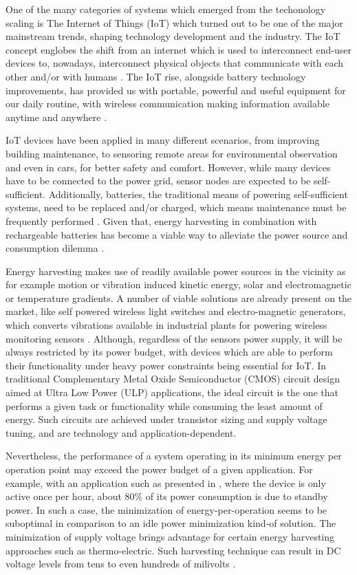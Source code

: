 \documentclass[pgmicro,diss,english]{iiufrgs}
\begin{document}
    One of the many categories of systems which emerged from the techonology scaling is The Internet of Things (IoT) which turned out to be one of the major mainstream trends, shaping technology development and the industry. The IoT concept englobes the shift from an internet which is used to interconnect end-user devices to, nowadays, interconnect physical objects that communicate with each other and/or with humans \cite{miorandi2012internet}. The IoT rise, alongside battery technology improvements, has provided us with portable, powerful and useful equipment for our daily routine, with wireless communication making information available anytime and anywhere \cite{manoli2010energy}.

    IoT devices have been applied in many different scenarios, from improving building maintenance, to sensoring remote areas for environmental observation and even in cars, for better safety and comfort. However, while many devices have to be connected to the power grid, sensor nodes are expected to be self-sufficient. Additionally, batteries, the traditional means of powering self-sufficient systems, need to be replaced and/or charged, which means maintenance must be frequently performed \cite{bleitner2018comparison}. Given that, energy harvesting in combination with rechargeable batteries has become a viable way to alleviate the power source and consumption dilemma \cite{manoli2010energy}.

    Energy harvesting makes use of readily available power sources in the vicinity as for example motion or vibration induced kinetic energy, solar and electromagnetic or temperature gradients. A number of viable solutions are already present on the market, like self powered wireless light switches and electro-magnetic generators, which converts vibrations available in industrial plants for powering wireless monitoring sensors \cite{manoli2010energy} \cite{bleitner2018comparison}. Although, regardless of the sensors power supply, it will be always restricted by its power budget, with devices which are able to perform their functionality under heavy power constraints being essential for IoT. In traditional Complementary Metal Oxide Semiconductor (CMOS) circuit design aimed at Ultra Low Power (ULP) applications, the ideal circuit is the one that performs a given task or functionality while consuming the least amount of energy. Such circuits are achieved under transistor sizing and supply voltage tuning, and are technology and application-dependent.

    Nevertheless, the performance of a system operating in its minimum energy per operation point may exceed the power budget of a given application. For example, with an application such as presented in \cite{fojtik2013millimeter}, where the device is only active once per hour, about 80\% of its power consumption is due to standby power. In such a case, the minimization of energy-per-operation seems to be suboptimal in comparison to an idle power minimization kind-of solution. The minimization of supply voltage brings advantage for certain energy harvesting approaches such as thermo-electric. Such harvesting technique can result in DC voltage levels from tens to even hundreds of milivolts \cite{khan2014flexible}.
\end{document}
